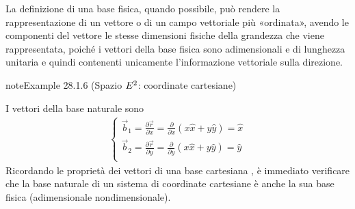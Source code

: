 \documentclass[letterpaper,10pt,italian]{jupyterBook}
\begin{document}
\sphinxAtStartPar
La definizione di una base fisica, quando possibile, può rendere la rappresentazione di un vettore o di un campo vettoriale più «ordinata», avendo le componenti del vettore le stesse dimensioni fisiche della grandezza che viene rappresentata, poiché i vettori della base fisica sono adimensionali e di lunghezza unitaria \sphinxhyphen{}  e quindi contenenti unicamente l’informazione vettoriale sulla direzione.
\label{ch/vector-calculus/geometry:example-8}
\begin{sphinxadmonition}{note}{Example 28.1.6 (Spazio \protect\(E^2\protect\): coordinate cartesiane)}



\sphinxAtStartPar
I vettori della base naturale sono
\begin{equation*}
\begin{split}\begin{cases}
  \vec{b}_1 = \frac{\partial \vec{r}}{\partial x} = \frac{\partial }{\partial x} \left( x \hat{x} + y \hat{y} \right) = \hat{x} \\
  \vec{b}_2 = \frac{\partial \vec{r}}{\partial y} = \frac{\partial }{\partial y} \left( x \hat{x} + y \hat{y} \right) = \hat{y} \\
\end{cases}\end{split}
\end{equation*}
\sphinxAtStartPar
Ricordando le proprietà dei vettori di una base cartesiana  , è immediato verificare che la base naturale di un sistema di coordinate cartesiane è anche la sua base fisica (adimensionale non\sphinxhyphen{}dimensionale).
\end{sphinxadmonition}
\label{ch/vector-calculus/geometry:example-9}
\end{document}

